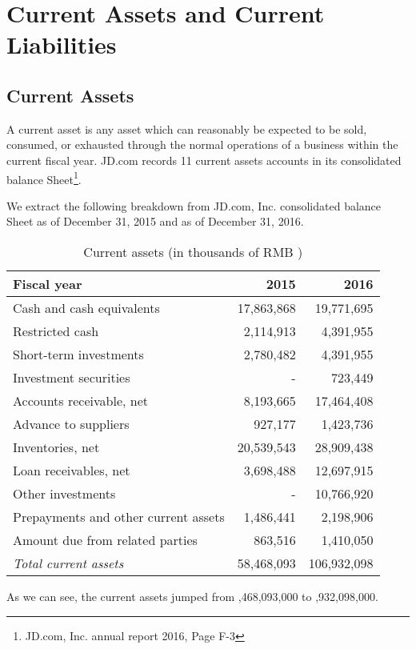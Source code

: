 \section{Current Assets and Current Liabilities}
\subsection{Current Assets}
A current asset is any asset which can reasonably be expected to be sold, consumed, or exhausted through the normal operations of a business within the current fiscal year. JD.com records 11 current assets accounts in its consolidated balance Sheet\footnote{JD.com, Inc. annual report 2016, Page F-3}. 

We extract the following breakdown from JD.com, Inc. consolidated balance Sheet as of December 31, 2015 and as of December 31, 2016.\\

\begin{table}[H]	
\begin{center}
	\begin{tabular}{lrr}
		\toprule
		\textbf{Fiscal year}&\textbf{2015}&\textbf{2016}\\
		\midrule
		Cash and cash equivalents&17,863,868&19,771,695\\
		Restricted cash&2,114,913&4,391,955\\
		Short-term investments&2,780,482&4,391,955\\
		Investment securities&-&723,449\\
		Accounts receivable, net&8,193,665&17,464,408\\
		Advance to suppliers&927,177&1,423,736\\
		Inventories, net&20,539,543&28,909,438\\
		Loan receivables, net&3,698,488&12,697,915\\
		Other investments&-&10,766,920\\
		Prepayments and other current assets&1,486,441&2,198,906\\
		Amount due from related parties&863,516&1,410,050\\
		\qquad\emph{Total current assets}&58,468,093&106,932,098\\
		\bottomrule
	\end{tabular}
\end{center}
	\caption{Current assets (in thousands of RMB \textyen)}\label{table:1}
\end{table}
As we can see, the current assets jumped from ,468,093,000 to ,932,098,000.

